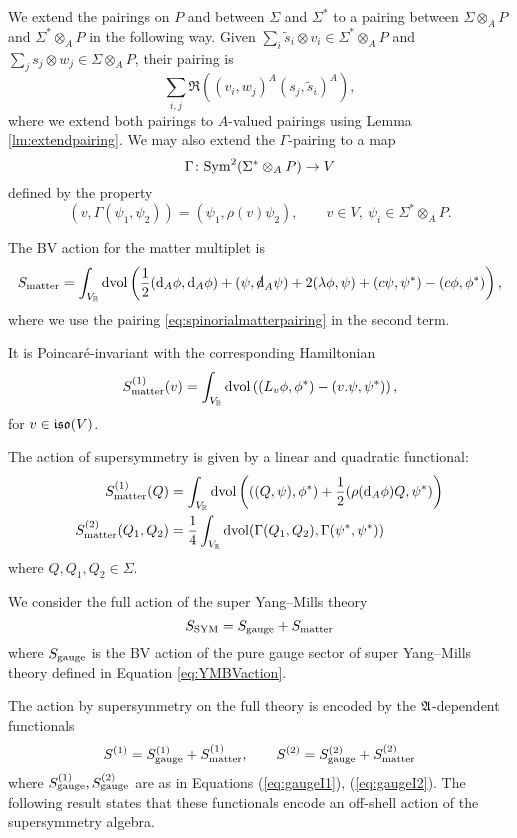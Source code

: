 \documentclass[10pt, oneside]{article}
\begin{document}
We extend the pairings on $P$ and between $\Sigma$ and $\Sigma^*$ to a pairing between $\Sigma\otimes_A P$ and $\Sigma^*\otimes_A P$ in the following way. Given $\sum_i \tilde{s}_i\otimes v_i\in \Sigma^*\otimes_A P$ and $\sum_j s_j\otimes w_j\in\Sigma\otimes_A P$, their pairing is
\begin{equation}
\sum_{i, j} \Re((v_i, w_j)^A (s_j, \tilde{s}_i)^A),
\label{eq:spinorialmatterpairing}
\end{equation}
where we extend both pairings to $A$-valued pairings using Lemma \ref{lm:extendpairing}. We may also extend the $\Gamma$-pairing to a map
\[\Gamma\colon {\rm Sym}^2(\Sigma^*\otimes_A P)\rightarrow V\]
defined by the property
\[(v, \Gamma(\psi_1, \psi_2)) = (\psi_1, \rho(v) \psi_2),\qquad v\in V,\ \psi_i\in \Sigma^*\otimes_A P.\]

The BV action for the matter multiplet is
\begin{equation}\label{matteraction}
S_{\matter} = \int_{V_\RR} \dvol \left(\frac{1}{2}  (\d_A \phi, \d_A \phi) + (\psi , \sd \d_A \psi) + 2 (\lambda\phi, \psi) + (c\psi, \psi^*) - (c\phi, \phi^*)\right),
\end{equation}
where we use the pairing \eqref{eq:spinorialmatterpairing} in the second term.

It is Poincar\'{e}-invariant with the corresponding Hamiltonian
\begin{equation}
S_{\mathrm{matter}}^{(1)}(v) = \int_{V_\mathbb R}\operatorname{dvol}\left( (L_{v}\phi, \phi^*) - (v.\psi, \psi^*)\right),
\label{eq:matterPoincareaction}
\end{equation}
for $v\in\mathfrak{iso}(V)$.

The action of supersymmetry is given by a linear and quadratic functional:
\begin{align}
S_{\mathrm{matter}}^{(1)} (Q) & = \int_{V_\mathbb R}\operatorname{dvol}\left( ((Q, \psi), \phi^*) + \frac{1}{2}(\rho({\rm d}_A \phi) Q, \psi^*)\right) \label{eq:matterI1} \\
S_{\mathrm{matter}}^{(2)} (Q_1 , Q_2) & = \frac{1}{4}\int_{V_\mathbb R} \operatorname{dvol}(\Gamma(Q_1, Q_2) , \Gamma(\psi^*, \psi^*)) \label{eq:matterI2}
\end{align}
where $Q, Q_1,Q_2 \in \Sigma$.

We consider the full action of the super Yang--Mills theory
\[S_{\rm SYM} = S_{\mathrm{gauge}} + S_{\mathrm{matter}}\]
where $S_{\mathrm{gauge}}$ is the BV action of the pure gauge sector of super Yang--Mills theory defined in Equation \eqref{eq:YMBVaction}.

The action by supersymmetry on the full theory is encoded by the $\mathfrak A$-dependent functionals
\[S^{(1)} = S^{(1)}_{\mathrm{gauge}} + S^{(1)}_{\mathrm{matter}},\qquad S^{(2)} = S^{(2)}_{\mathrm{gauge}} + S^{(2)}_{\mathrm{matter}}\]
where $S^{(1)}_{\mathrm{gauge}}, S^{(2)}_{\mathrm{gauge}}$ are as in Equations (\ref{eq:gaugeI1}), (\ref{eq:gaugeI2}).
The following result states that these functionals encode an off-shell action of the supersymmetry algebra.
\end{document}
